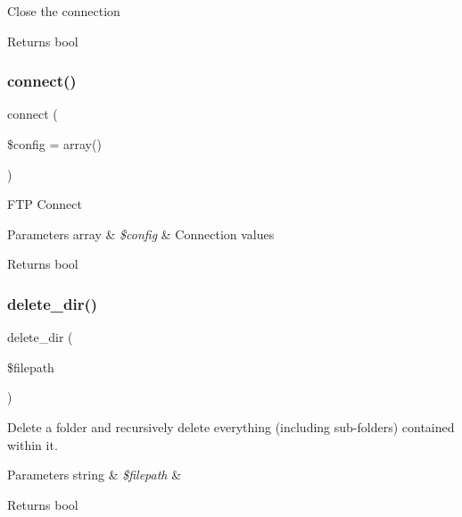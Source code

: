 Close the connection

\begin{DoxyReturn}{Returns}
bool 
\end{DoxyReturn}
\mbox{\label{class_c_i___f_t_p_ab2827759611aaaf0c59e69661122c534}} 
\subsubsection{\texorpdfstring{connect()}{connect()}}
{\footnotesize\ttfamily connect (\begin{DoxyParamCaption}\item[{}]{\$config = {\ttfamily array()} }\end{DoxyParamCaption})}

F\+TP Connect


\begin{DoxyParams}[1]{Parameters}
array & {\em \$config} & Connection values \\
\hline
\end{DoxyParams}
\begin{DoxyReturn}{Returns}
bool 
\end{DoxyReturn}
\mbox{\label{class_c_i___f_t_p_af09b3ab08984b145506dcff4f75a051c}} 
\subsubsection{\texorpdfstring{delete\+\_\+dir()}{delete\_dir()}}
{\footnotesize\ttfamily delete\+\_\+dir (\begin{DoxyParamCaption}\item[{}]{\$filepath }\end{DoxyParamCaption})}

Delete a folder and recursively delete everything (including sub-\/folders) contained within it.


\begin{DoxyParams}[1]{Parameters}
string & {\em \$filepath} & \\
\hline
\end{DoxyParams}
\begin{DoxyReturn}{Returns}
bool 
\end{DoxyReturn}
\mbox{\label{class_c_i___f_t_p_aad793fb503643d98b58426421718e18a}} 
